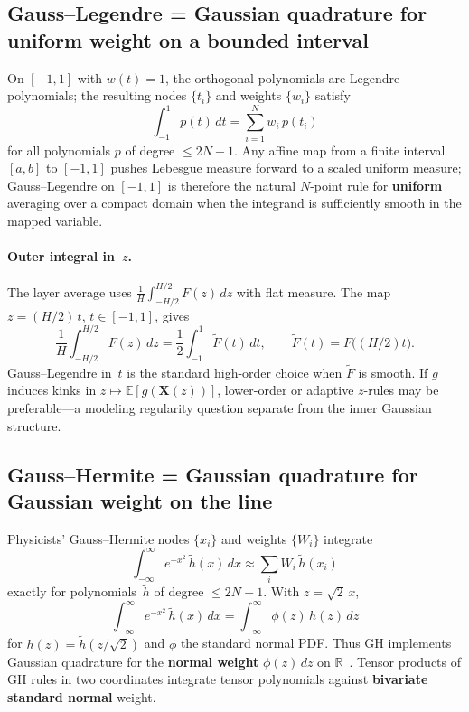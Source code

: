 \documentclass[11pt,a4paper]{article}
\begin{document}
\subsection{Gauss--Legendre = Gaussian quadrature for uniform weight on a bounded interval}
On $[-1,1]$ with $w(t)=1$, the orthogonal polynomials are Legendre polynomials; the resulting nodes $\{t_i\}$ and weights $\{w_i\}$ satisfy
\begin{equation}
\label{eq:gl-basic}
  \int_{-1}^1 p(t)\,dt = \sum_{i=1}^N w_i\,p(t_i)
\end{equation}
for all polynomials $p$ of degree $\le 2N-1$.
Any affine map from a finite interval $[a,b]$ to $[-1,1]$ pushes Lebesgue measure forward to a scaled uniform measure; Gauss--Legendre on $[-1,1]$ is therefore the natural $N$-point rule for \textbf{uniform} averaging over a compact domain when the integrand is sufficiently smooth in the mapped variable.

\paragraph{Outer integral in~$z$.}
The layer average uses $\frac{1}{H}\int_{-H/2}^{H/2} F(z)\,dz$ with flat measure.
The map $z=(H/2)\,t$, $t\in[-1,1]$, gives
\[
  \frac{1}{H}\int_{-H/2}^{H/2} F(z)\,dz = \frac{1}{2}\int_{-1}^1 \tilde F(t)\,dt,
  \qquad \tilde F(t)=F\bigl((H/2)t\bigr).
\]
Gauss--Legendre in~$t$ is the standard high-order choice when $\tilde F$ is smooth.
If $g$ induces kinks in $z\mapsto\mathbb{E}[g(\mathbf{X}(z))]$, lower-order or adaptive $z$-rules may be preferable---a modeling regularity question separate from the inner Gaussian structure.

\subsection{Gauss--Hermite = Gaussian quadrature for Gaussian weight on the line}
Physicists' Gauss--Hermite nodes $\{x_i\}$ and weights $\{W_i\}$ integrate
\[
  \int_{-\infty}^{\infty} e^{-x^2}\,\tilde h(x)\,dx \approx \sum_i W_i\,\tilde h(x_i)
\]
exactly for polynomials~$\tilde h$ of degree $\le 2N-1$.
With $z=\sqrt{2}\,x$,
\[
  \int_{-\infty}^{\infty} e^{-x^2}\,\tilde h(x)\,dx
  = \int_{-\infty}^{\infty} \phi(z)\,h(z)\,dz
\]
for $h(z)=\tilde h(z/\sqrt{2})$ and $\phi$ the standard normal PDF.
Thus GH implements Gaussian quadrature for the \textbf{normal weight} $\phi(z)\,dz$ on $\mathbb{R}$~\cite{gautschi}.
Tensor products of GH rules in two coordinates integrate tensor polynomials against \textbf{bivariate standard normal} weight.
\end{document}
